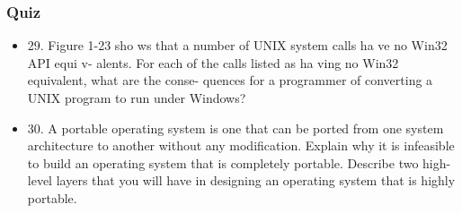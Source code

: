 \begin{frame}
    \frametitle{Quiz}
    
    \begin{itemize}
        \item
        29. Figure 1-23 sho ws that a number of UNIX system calls ha ve no Win32 API equi v-
        alents. For each of the calls listed as ha ving no Win32 equivalent, what are the conse-
        quences for a programmer of converting a UNIX program to run under Windows?
        \item
        30. A portable operating system is one that can be ported from one system architecture to
        another without any modification. Explain why it is infeasible to build an operating
        system that is completely portable. Describe two high-level layers that you will have in
        designing an operating system that is highly portable.
    \end{itemize}    

\end{frame}
